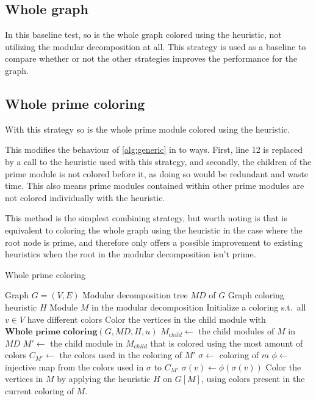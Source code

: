 \documentclass[a4paper]{article}
\begin{document}
\subsection{Whole graph}

In this baseline test, so is the whole graph colored using the heuristic, not
utilizing the modular decomposition at all. This strategy is used as a baseline
to compare whether or not the other strategies improves the performance for the
graph.

\subsection{Whole prime coloring}

With this strategy so is the whole prime module colored using the heuristic. 

This modifies the behaviour of \autoref{alg:generic} in to ways. First, line 12 is replaced by a
call to the heuristic used with this strategy, and secondly, the children of the prime
module is not colored before it, as doing so would be redundant and waste time.
This also means prime modules contained within other prime modules are not
colored individually with the heuristic.

This method is the simplest combining strategy, but worth noting is that is
equivalent to coloring the whole graph using the heuristic in the case where the
root node is prime, and therefore only offers a possible improvement to existing
heuristics when the root in the modular decomposition isn't prime.

\begin{algorithm}[H]
  \caption{Whole prime coloring}
  \label{alg:wpc}
  \begin{algorithmic}[1]
    \REQUIRE Graph $G = (V,E)$ 
    \REQUIRE Modular decomposition tree $MD$ of $G$
    \REQUIRE Graph coloring heuristic $H$
    \REQUIRE Module $M$ in the modular decomposition
    \STATE Initialize a coloring s.t.\ all $v \in V$
           have different colors
            \STATE Color the vertices in the child module with \\
            $\textbf{Whole prime coloring}(G,MD,H,u)$
        \ENDFOR
          \STATE $M_{child} \leftarrow $ the child modules of $M$ in $MD$
          \STATE $M' \leftarrow $ the child module in $M_{child}$ that is colored using the most amount of colors
          \STATE $C_{M'} \leftarrow $ the colors used in the coloring of $M'$
             \STATE $\sigma \leftarrow $ coloring of $m$
             \STATE $\phi \leftarrow $ injective map from the colors used in $\sigma$ to $C_{M'}$
                \STATE $\sigma(v)\leftarrow \phi(\sigma(v))$  
             \ENDFOR
          \ENDFOR
        \ENDIF
    \ELSE
        \STATE Color the vertices in $M$ by applying the heuristic $H$ on $G[M]$, using colors present in the current coloring of $M$.
    \ENDIF
  \end{algorithmic}
\end{algorithm}
\end{document}
